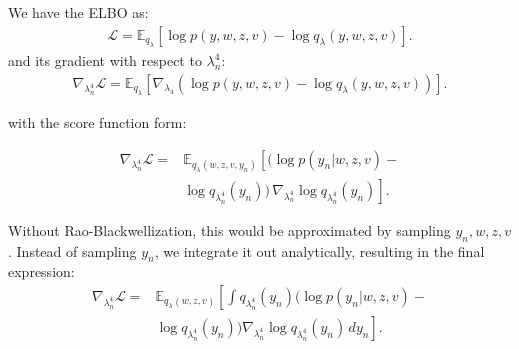 \documentclass{article}
\begin{document}
\begin{multicols}{2}
We have the ELBO as:
\begin{align*}
    \mathcal{L} = \mathbb{E}_{q_\lambda}\left[\log p(y, w, z, v) - \log q_\lambda(y, w, z, v)\right].
\end{align*}
and its gradient with respect to \(\lambda_n^4\):
\begin{align*}
    \nabla_{\lambda_n^4}\mathcal{L} = \mathbb{E}_{q_\lambda}\left[\nabla_{\lambda_4}(\log p(y, w, z, v) - \log q_\lambda(y, w, z, v))\right].
\end{align*}

with the score function form:

\begin{align*}
    \nabla_{\lambda_n^4}\mathcal{L} =& \mathbb{E}_{q_\lambda(w,z,v,y_n)}\left[(\log p(y_n|w,z,v)-\right.\\&\left.\log q_{\lambda_n^4}(y_n))\,\nabla_{\lambda_n^4}\log q_{\lambda_n^4}(y_n)\right].
\end{align*}

Without Rao-Blackwellization, this would be approximated by sampling $y_n, w,z,v$.
Instead of sampling $y_n$, we integrate it out analytically, resulting in the final expression:
\begin{align*}
    \nabla_{\lambda_n^4}\mathcal{L} 
    =& \mathbb{E}_{q_\lambda(w,z,v)}\left[\int q_{\lambda_n^4}(y_n) (\log p(y_n|w,z,v)-\right.\\&\left.\log q_{\lambda_n^4}(y_n)) \nabla_{\lambda_n^4}\log q_{\lambda_n^4}(y_n)\,dy_n\right].
\end{align*}




\end{multicols}

\clearpage
{}
\printbibliography{}
\end{document}
